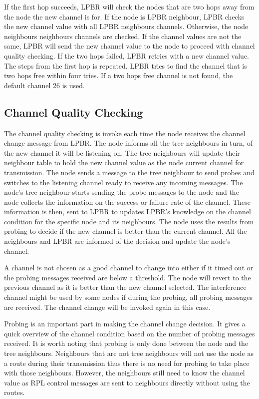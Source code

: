 If the first hop succeeds, LPBR will check the nodes that are two hops away from the node the new channel is for. If the node is LPBR neighbour, LPBR checks the new channel value with all LPBR neighbours channels. Otherwise, the node neighbours neighbours channels are checked. If the channel values are not the same, LPBR will send the new channel value to the node to proceed with channel quality checking. If the two hops failed, LPBR retries with a new channel value. The steps from the first hop is repeated. LPBR tries to find the channel that is two hops free within four tries. If a two hops free channel is not found, the default channel 26 is used.

\subsection{Channel Quality Checking}

The channel quality checking is invoke each time the node receives the channel change message from LPBR. The node informs all the tree neighbours in turn, of the new channel it will be listening on. The tree neighbours will update their neighbour table to hold the new channel value as the node current channel for transmission. The node sends a message to the tree neighbour to send probes and switches to the listening channel ready to receive any incoming messages. The node's tree neighbour starts sending the probe messages to the node and the node collects the information on the success or failure rate of the channel. These information is then, sent to LPBR to updates LPBR's knowledge on the channel condition for the specific node and its neighbours. The node uses the results from probing to decide if the new channel is better than the current channel. All the neighbours and LPBR are informed of the decision and update the node's channel.

A channel is not chosen as a good channel to change into either if it timed out or the probing messages received are below a threshold. The node will revert to the previous channel as it is better than the new channel selected. The interference channel might be used by some nodes if during the probing, all probing messages are received. The channel change will be invoked again in this case.

Probing is an important part in making the channel change decision. It gives a quick overview of the channel condition based on the number of probing messages received. It is worth noting that probing is only done between the node and the tree neighbours. Neighbours that are not tree neighbours will not use the node as a route during their transmission thus there is no need for probing to take place with those neighbours. However, the neighbours still need to know the channel value as RPL control messages are sent to neighbours directly without using the routes.


